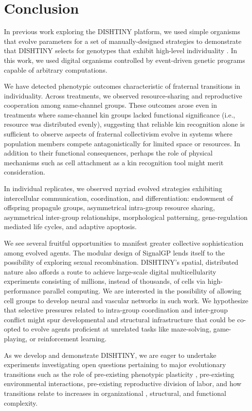 \section{Conclusion}

In previous work exploring the DISHTINY platform, we used simple organisms that evolve parameters for a set of manually-designed strategies to demonstrate that DISHTINY selects for genotypes that exhibit high-level individuality \cite{moreno2018toward}.
In this work, we used digital organisms controlled by event-driven genetic programs capable of arbitrary computations.

We have detected phenotypic outcomes characteristic of fraternal transitions in individuality.
Across treatments, we observed resource-sharing and reproductive cooperation among same-channel groups.
These outcomes arose even in treatments where same-channel kin groups lacked functional significance (i.e., resource was distributed evenly), suggesting that reliable kin recognition alone is sufficient to observe aspects of fraternal collectivism evolve in systems where population members compete antagonistically for limited space or resources.
In addition to their functional consequences, perhaps the role of physical mechanisms such as cell attachment as a kin recognition tool might merit consideration.

In individual replicates, we observed myriad evolved strategies exhibiting intercellular communication, coordination, and differentiation: endowment of offspring propagule groups, asymmetrical intra-group resource sharing, asymmetrical inter-group relationships, morphological patterning, gene-regulation mediated life cycles, and adaptive apoptosis.

We see several fruitful opportunities to manifest greater collective sophistication among evolved agents.
The modular design of SignalGP lends itself to the possibility of exploring sexual recombination.
DISHTINY's spatial, distributed nature also affords a route to achieve large-scale digital multicellularity experiments consisting of millions, instead of thousands, of cells via high-performance parallel computing.
We are interested in the possibility of allowing cell groups to develop neural and vascular networks in such work.
We hypothesize that selective pressures related to intra-group coordination and inter-group conflict might spur developmental and structural infrastructure that could be co-opted to evolve agents proficient at unrelated tasks like maze-solving, game-playing, or reinforcement learning.

As we develop and demonstrate DISHTINY, we are eager to undertake experiments investigating open questions pertaining to major evolutionary transitions such as the role of pre-existing phenotypic plasticity \citep{clune2007investigating, lalejini2016evolutionary}, pre-existing environmental interactions, pre-existing reproductive division of labor, and how transitions relate to increases in organizational \citep{goldsby2012task}, structural, and functional \citep{goldsby2014evolutionary} complexity.
